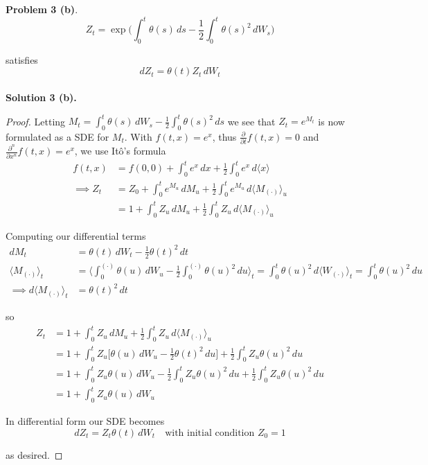 \documentclass[12pt]{article}
\begin{document}
{\bf Problem 3 (b)}. 
\begin{equation*}
	Z_t = \exp\Bigg(\int^t_0 \theta(s)\,ds - \frac{1}{2}\int^t_0 \theta(s)^2\,dW_s\Bigg)
\end{equation*}

satisfies
\begin{equation*}
	dZ_t = \theta(t)Z_t\,dW_t
\end{equation*}	\\

{\bf Solution 3 (b).}
\begin{proof} Letting $M_t = \int^t_0 \theta(s)\,dW_s - \frac{1}{2}\int^t_0 \theta(s)^2\,ds$ we see that $Z_t = e^{M_t}$ is now formulated as a SDE for $M_t$. With $f(t,x) = e^x$, thus $\frac{\partial}{\partial t} f(t,x) = 0$ and $\frac{\partial^n}{\partial x^n} f(t,x) = e^x$, we use It\^{o}'s formula
\begin{align*}
	f(t,x) &= f(0,0) + \int^t_0 e^x \,dx + \frac{1}{2}\int^t_0 e^x\,d\langle x\rangle \\
	\implies Z_t &= Z_0 + \int^t_0 e^{M_u}\,dM_u + \frac{1}{2}\int^t_0 e^{M_u}\,d\langle M_{(\cdot)}\rangle_u \\
	&= 1 + \int^t_0 Z_u\,dM_u + \frac{1}{2}\int^t_0 Z_u\,d\langle M_{(\cdot)}\rangle_u
\end{align*}
	
Computing our differential terms
\begin{align*}
	dM_t &= \theta(t)\,dW_t - \frac{1}{2}\theta(t)^2\,dt \\
	\langle M_{(\cdot)}\rangle_t &= \Big\langle \int^{(\cdot)}_0 \theta(u)\,dW_u - \frac{1}{2}\int^{(\cdot)}_0 \theta(u)^2\,du \Big\rangle_t = \int^t_0 \theta(u)^2\,d\langle W_{(\cdot)} \rangle_t = \int^t_0 \theta(u)^2\,du \\
	\implies d\langle M_{(\cdot)} \rangle_t &= \theta(t)^2\,dt
\end{align*}
	
so
\begin{align*}
	Z_t &= 1 + \int^t_0 Z_u\,dM_u + \frac{1}{2}\int^t_0 Z_u\,d\langle M_{(\cdot)}\rangle_u \\
	&= 1 + \int^t_0 Z_u\bigg[\theta(u)\,dW_u - \frac{1}{2}\theta(t)^2\,du \bigg]+ \frac{1}{2}\int^t_0 Z_u\theta(u)^2\,du \\
	&= 1 + \int^t_0 Z_u\theta(u)\,dW_u - \frac{1}{2}\int^t_0Z_u\theta(u)^2\,du + \frac{1}{2}\int^t_0 Z_u\theta(u)^2\,du \\
	&= 1 + \int^t_0 Z_u\theta(u)\,dW_u
\end{align*}		
	
In differential form our SDE becomes
\begin{equation*}
	dZ_t = Z_t\theta(t)\,dW_t \quad \text{with initial condition } Z_0 = 1
\end{equation*}
	
as desired.
\end{proof}
\hfill\newline
\end{document}
